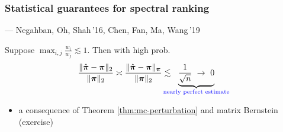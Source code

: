 \documentclass[compress,
mathserif,wide,%
]{beamer}
\begin{document}
\begin{frame}
	\frametitle{Statistical guarantees for spectral ranking}

	\hfill --- {\small Negahban, Oh, Shah\,'16, Chen, Fan, Ma, Wang\,'19}

	\vfill

	Suppose $\max_{i,j} \frac{w_i}{w_j} \lesssim 1$. Then with high prob.
	\begin{align*}
		\frac{\| \hat{\bm{\pi}} - \bm{\pi} \|_2 }{\|\bm{\pi} \|_2} \asymp \frac{\| \hat{\bm{\pi}} - \bm{\pi} \|_{\bm{\pi}} }{\|\bm{\pi} \|_{2}} \lesssim  \hspace{-1.2em} \underset{\textcolor{blue}{ \text{nearly perfect estimate}}}{\underbrace{ \frac{1}{\sqrt{n}} ~\rightarrow~ 0 }}
	\end{align*}

	\begin{itemize}
		\item a consequence of Theorem \ref{thm:mc-perturbation} and  matrix Bernstein (exercise)
	\end{itemize}

\end{frame}
\end{document}

